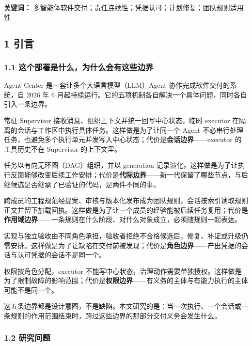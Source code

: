 \documentclass[
]{article}
\begin{document}
\textbf{关键词：}
多智能体软件交付；责任连续性；凭据认可；计划修复；团队规则适用性

\subsection{1 引言}\label{ux5f15ux8a00}

\subsubsection{1.1
这个部署是什么，为什么会有这些边界}\label{ux8fd9ux4e2aux90e8ux7f72ux662fux4ec0ux4e48ux4e3aux4ec0ux4e48ux4f1aux6709ux8fd9ux4e9bux8fb9ux754c}

Agent Center 是一套让多个大语言模型（LLM）Agent
协作完成软件交付的系统，自 2026 年 6
月起持续运行。它的五项机制各自解决一个具体问题，同时各自引入一条边界。

常驻 Supervisor 接收消息、组织上下文并统一回写中心状态，临时 executor
在隔离的会话与工作区中执行具体任务。这样做是为了让同一个 Agent
不必串行处理任务，也避免多个执行单元并发写入中心状态；代价是\textbf{会话边界}------executor
的工具历史不在 Supervisor 的上下文里。

任务以有向无环图（DAG）组织，并以 generation
记录演化。这样做是为了让执行反馈能够改变后续工作安排；代价是\textbf{代际边界}------新一代保留了哪些节点，与后继候选是否继承了已验证的代码，是两件不同的事。

跨成员的工程规范经提案、审核与版本化发布成为团队规则，会话按索引读取规则正文并留下加载回执。这样做是为了让一个成员的经验能被后续任务复用；代价是\textbf{作用域边界}------一条规则在什么阶段、对什么对象成立，必须随规则一起表达。

实现与独立验收由不同角色承担，验收者拒绝不合格候选后，修复、补证或升级仍需安排。这样做是为了让缺陷在交付前被发现；代价是\textbf{角色边界}------产出凭据的会话与认可凭据的会话不是同一个。

权限按角色分配，executor
不能写中心状态，治理动作需要单独授权。这样做是为了限制故障的影响范围；代价是\textbf{权限边界}------有义务的主体与有能力执行的主体可能不是同一个。

这五条边界都是设计意图，不是缺陷。本文研究的是：当一次执行、一个会话或一条规则的作用范围结束时，跨过这些边界的那部分交付义务会发生什么。

\subsubsection{1.2 研究问题}\label{ux7814ux7a76ux95eeux9898}
\end{document}

